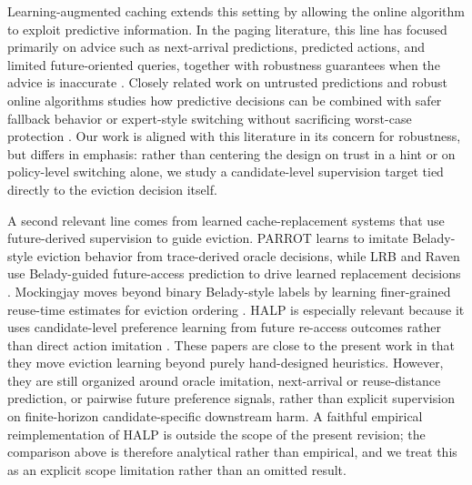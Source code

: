 \documentclass[preprint,12pt]{elsarticle}
\begin{document}
Learning-augmented caching extends this setting by allowing the online algorithm to exploit predictive information. In the paging literature, this line has focused primarily on advice such as next-arrival predictions, predicted actions, and limited future-oriented queries, together with robustness guarantees when the advice is inaccurate \cite{lykouris2021competitive_caching,rohatgi2020near_optimal_caching,bansal2022learning_augmented_weighted_paging,im2022parsimonious_lac}. Closely related work on untrusted predictions and robust online algorithms studies how predictive decisions can be combined with safer fallback behavior or expert-style switching without sacrificing worst-case protection \cite{antoniadis2020online_metric_untrusted,wei2020better_simpler_lac,chledowski2021robust_lac_experimental,blum2000online_learning_mts}. Our work is aligned with this literature in its concern for robustness, but differs in emphasis: rather than centering the design on trust in a hint or on policy-level switching alone, we study a candidate-level supervision target tied directly to the eviction decision itself.

A second relevant line comes from learned cache-replacement systems that use future-derived supervision to guide eviction. PARROT learns to imitate Belady-style eviction behavior from trace-derived oracle decisions, while LRB and Raven use Belady-guided future-access prediction to drive learned replacement decisions \cite{liu2020parrot,song2020lrb,hu2022raven}. Mockingjay moves beyond binary Belady-style labels by learning finer-grained reuse-time estimates for eviction ordering \cite{shah2022mockingjay}. HALP is especially relevant because it uses candidate-level preference learning from future re-access outcomes rather than direct action imitation \cite{song2023halp}. These papers are close to the present work in that they move eviction learning beyond purely hand-designed heuristics. However, they are still organized around oracle imitation, next-arrival or reuse-distance prediction, or pairwise future preference signals, rather than explicit supervision on finite-horizon candidate-specific downstream harm. A faithful empirical reimplementation of HALP is outside the scope of the present revision; the comparison above is therefore analytical rather than empirical, and we treat this as an explicit scope limitation rather than an omitted result.
\end{document}
